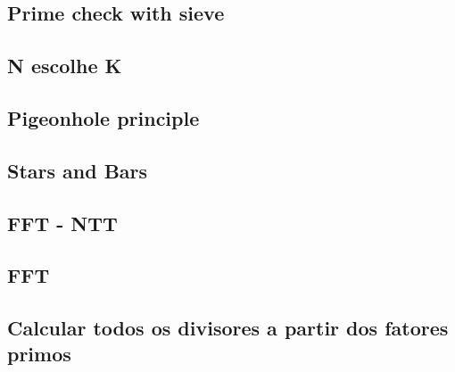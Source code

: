 \subsection{Prime check with sieve}


\subsection{N escolhe K}


\subsection{Pigeonhole principle}


\subsection{Stars and Bars}


\subsection{FFT - NTT}


\subsection{FFT}


\subsection{Calcular todos os divisores a partir dos fatores primos}
